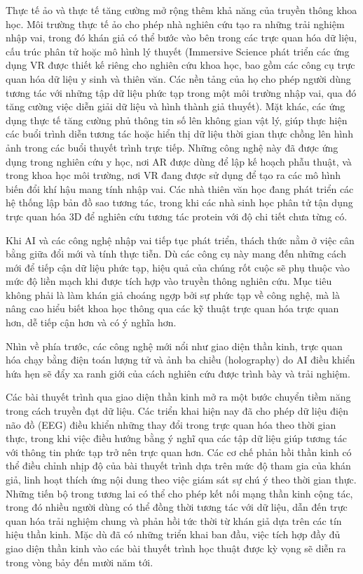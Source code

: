 Thực tế ảo và thực tế tăng cường mở rộng thêm khả năng của truyền thông khoa học. Môi trường thực tế ảo cho phép nhà nghiên cứu tạo ra những trải nghiệm nhập vai, trong đó khán giả có thể bước vào bên trong các trực quan hóa dữ liệu, cấu trúc phân tử hoặc mô hình lý thuyết (Immersive Science phát triển các ứng dụng VR được thiết kế riêng cho nghiên cứu khoa học, bao gồm các công cụ trực quan hóa dữ liệu y sinh và thiên văn. Các nền tảng của họ cho phép người dùng tương tác với những tập dữ liệu phức tạp trong một môi trường nhập vai, qua đó tăng cường việc diễn giải dữ liệu và hình thành giả thuyết). Mặt khác, các ứng dụng thực tế tăng cường phủ thông tin số lên không gian vật lý, giúp thực hiện các buổi trình diễn tương tác hoặc hiển thị dữ liệu thời gian thực chồng lên hình ảnh trong các buổi thuyết trình trực tiếp. Những công nghệ này đã được ứng dụng trong nghiên cứu y học, nơi AR được dùng để lập kế hoạch phẫu thuật, và trong khoa học môi trường, nơi VR đang được sử dụng để tạo ra các mô hình biến đổi khí hậu mang tính nhập vai. Các nhà thiên văn học đang phát triển các hệ thống lập bản đồ sao tương tác, trong khi các nhà sinh học phân tử tận dụng trực quan hóa 3D để nghiên cứu tương tác protein với độ chi tiết chưa từng có.

Khi AI và các công nghệ nhập vai tiếp tục phát triển, thách thức nằm ở việc cân bằng giữa đổi mới và tính thực tiễn. Dù các công cụ này mang đến những cách mới để tiếp cận dữ liệu phức tạp, hiệu quả của chúng rốt cuộc sẽ phụ thuộc vào mức độ liền mạch khi được tích hợp vào truyền thông nghiên cứu. Mục tiêu không phải là làm khán giả choáng ngợp bởi sự phức tạp về công nghệ, mà là nâng cao hiểu biết khoa học thông qua các kỹ thuật trực quan hóa trực quan hơn, dễ tiếp cận hơn và có ý nghĩa hơn.

Nhìn về phía trước, các công nghệ mới nổi như giao diện thần kinh, trực quan hóa chạy bằng điện toán lượng tử và ảnh ba chiều (holography) do AI điều khiển hứa hẹn sẽ đẩy xa ranh giới của cách nghiên cứu được trình bày và trải nghiệm.

Các bài thuyết trình qua giao diện thần kinh mở ra một bước chuyển tiềm năng trong cách truyền đạt dữ liệu. Các triển khai hiện nay đã cho phép dữ liệu điện não đồ (EEG) điều khiển những thay đổi trong trực quan hóa theo thời gian thực, trong khi việc điều hướng bằng ý nghĩ qua các tập dữ liệu giúp tương tác với thông tin phức tạp trở nên trực quan hơn. Các cơ chế phản hồi thần kinh có thể điều chỉnh nhịp độ của bài thuyết trình dựa trên mức độ tham gia của khán giả, linh hoạt thích ứng nội dung theo việc giám sát sự chú ý theo thời gian thực. Những tiến bộ trong tương lai có thể cho phép kết nối mạng thần kinh cộng tác, trong đó nhiều người dùng có thể đồng thời tương tác với dữ liệu, dẫn đến trực quan hóa trải nghiệm chung và phản hồi tức thời từ khán giả dựa trên các tín hiệu thần kinh. Mặc dù đã có những triển khai ban đầu, việc tích hợp đầy đủ giao diện thần kinh vào các bài thuyết trình học thuật được kỳ vọng sẽ diễn ra trong vòng bảy đến mười năm tới.

